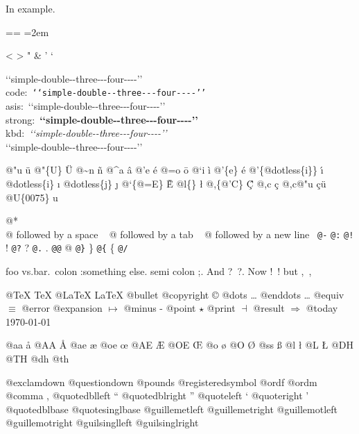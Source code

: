\documentclass{book}
\makeatletter
\newcommand\GNUTexinfocommandstyletextkbd[1]{{\ttfamily\textsl{#1}}}%
\newenvironment{GNUTexinfopreformatted}{%
  \par\obeylines\obeyspaces\frenchspacing
  \parskip=\z@\parindent=\z@}{}
\makeatother
\begin{document}
In example.
\begin{GNUTexinfopreformatted}
\leftskip=2em\relax\ttfamily%

<
>
"
\&
'
`

{`}{`}simple-double{-}{-}three{-}{-}{-}four{-}{-}{-}-{'}{'}\leavevmode{}\\
code:\ \texttt{{`}{`}simple-double{-}{-}three{-}{-}{-}four{-}{-}{-}-{'}{'}} \leavevmode{}\\
asis:\ {`}{`}simple-double{-}{-}three{-}{-}{-}four{-}{-}{-}-{'}{'} \leavevmode{}\\
strong:\ \textbf{{`}{`}simple-double{-}{-}three{-}{-}{-}four{-}{-}{-}-{'}{'}} \leavevmode{}\\
kbd:\ \GNUTexinfocommandstyletextkbd{{`}{`}simple-double{-}{-}three{-}{-}{-}four{-}{-}{-}-{'}{'}} \leavevmode{}\\

`\hbox{}`simple-double-\hbox{}-three{-}{-}{-}four{-}{-}{-}-'\hbox{}'\leavevmode{}\\

%
%
%
%

@"u \"{u} 
@"\{U\} \"{U} 
@\~{}n \~{n}
@\^{}a \^{a}
@'e \'{e}
@=o \={o}
@`i \`{i}
@'\{e\} \'{e}
@'\{@dotless\{i\}\} \'{\i{}} 
@dotless\{i\} \i{}
@dotless\{j\} \j{}
@`\{@=E\} \`{\={E}} 
@l\{\} \l{}
@,\{@'C\} \c{\'{C}}
@,c \c{c}
@,c@"u \c{c}\"{u} \leavevmode{}\\

@U\{0075\} u

@* \leavevmode{}\\
@ followed by a space
\ {}
@ followed by a tab
\ {}
@ followed by a new line
\ {}\texttt{@-} \-{}
\texttt{@:} \@
\texttt{@!} \@!
\texttt{@?} \@?
\texttt{@.} \@.
\texttt{@@} @
\texttt{@\}} \}
\texttt{@\{} \{
\texttt{@/} 

foo vs.\@ bar.\ 
colon :\@And something else.
semi colon ;\@.
And ?\ ?\@.
Now !\ !\@@
but ,\ ,\@

@TeX \TeX{}
@LaTeX \LaTeX{}
@bullet \textbullet{}
@copyright \copyright{}
@dots \dots{}\@
@enddots \dots{}
@equiv $\equiv{}$
@error 
@expansion $\mapsto{}$
@minus -
@point $\star{}$
@print $\dashv{}$
@result $\Rightarrow{}$
@today \today{}

@aa \aa{}
@AA \AA{}
@ae \ae{}
@oe \oe{}
@AE \AE{}
@OE \OE{}
@o \o{}
@O \O{}
@ss \ss{}
@l \l{}
@L \L{}
@DH \DH{}
@TH \TH{}
@dh \dh{}
@th \th{}

@exclamdown \textexclamdown{}
@questiondown \textquestiondown{}
@pounds \textsterling{}
@registeredsymbol \circledR{}
@ordf \textordfeminine{}
@ordm \textordmasculine{}
@comma ,
@quotedblleft \textquotedblleft{}
@quotedblright \textquotedblright{}
@quoteleft \textquoteleft{}
@quoteright \textquoteright{}
@quotedblbase \quotedblbase{}
@quotesinglbase \quotesinglbase{}
@guillemetleft \guillemotleft{}
@guillemetright \guillemotright{}
@guillemotleft \guillemotleft{}
@guillemotright \guillemotright{}
@guilsinglleft \guilsinglleft{}
@guilsinglright \guilsinglright{}


\end{GNUTexinfopreformatted}
\end{document}

